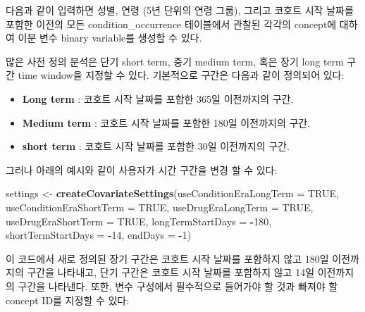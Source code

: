\documentclass[10.5pt]{book}
\newenvironment{Shaded}{\begin{snugshade}}{\end{snugshade}}
\newcommand{\KeywordTok}[1]{\textcolor[rgb]{0.13,0.29,0.53}{\textbf{#1}}}
\newcommand{\DataTypeTok}[1]{\textcolor[rgb]{0.13,0.29,0.53}{#1}}
\newcommand{\DecValTok}[1]{\textcolor[rgb]{0.00,0.00,0.81}{#1}}
\newcommand{\StringTok}[1]{\textcolor[rgb]{0.31,0.60,0.02}{#1}}
\newcommand{\OtherTok}[1]{\textcolor[rgb]{0.56,0.35,0.01}{#1}}
\newcommand{\OperatorTok}[1]{\textcolor[rgb]{0.81,0.36,0.00}{\textbf{#1}}}
\newcommand{\NormalTok}[1]{#1}
\providecommand{\tightlist}{%
  \setlength{\itemsep}{0pt}\setlength{\parskip}{0pt}}
\theoremstyle{definition}
\theoremstyle{definition}
\theoremstyle{definition}
\theoremstyle{remark}
\begin{document}
다음과 같이 입력하면 성별, 연령 (5년 단위의 연령 그룹), 그리고 코호트
시작 날짜를 포함한 이전의 모든 condition\_occurrence 테이블에서 관찰된
각각의 concept에 대하여 이분 변수 binary variable를 생성할 수 있다.

많은 사전 정의 분석은 단기 short term, 중기 medium term, 혹은 장기 long
term 구간 time window을 지정할 수 있다. 기본적으로 구간은 다음과 같이
정의되어 있다:

\begin{itemize}
\tightlist
\item
  \textbf{Long term} : 코호트 시작 날짜를 포함한 365일 이전까지의 구간.
\item
  \textbf{Medium term} : 코호트 시작 날짜를 포함한 180일 이전까지의
  구간.
\item
  \textbf{short term} : 코호트 시작 날짜를 포함한 30일 이전까지의 구간.
\end{itemize}

그러나 아래의 예시와 같이 사용자가 시간 구간을 변경 할 수 있다:

\begin{Shaded}
\begin{Highlighting}[]
\NormalTok{settings <-}\StringTok{ }\KeywordTok{createCovariateSettings}\NormalTok{(}\DataTypeTok{useConditionEraLongTerm =} \OtherTok{TRUE}\NormalTok{,}
                                    \DataTypeTok{useConditionEraShortTerm =} \OtherTok{TRUE}\NormalTok{,}
                                    \DataTypeTok{useDrugEraLongTerm =} \OtherTok{TRUE}\NormalTok{,}
                                    \DataTypeTok{useDrugEraShortTerm =} \OtherTok{TRUE}\NormalTok{,}
                                    \DataTypeTok{longTermStartDays =} \OperatorTok{-}\DecValTok{180}\NormalTok{,}
                                    \DataTypeTok{shortTermStartDays =} \OperatorTok{-}\DecValTok{14}\NormalTok{,}
                                    \DataTypeTok{endDays =} \OperatorTok{-}\DecValTok{1}\NormalTok{)}
\end{Highlighting}
\end{Shaded}

이 코드에서 새로 정의된 장기 구간은 코호트 시작 날짜를 포함하지 않고
180일 이전까지의 구간을 나타내고, 단기 구간은 코호트 시작 날짜를
포함하지 않고 14일 이전까지의 구간을 나타낸다. 또한, 변수 구성에서
필수적으로 들어가야 할 것과 빠져야 할 concept ID를 지정할 수 있다:
\end{document}
